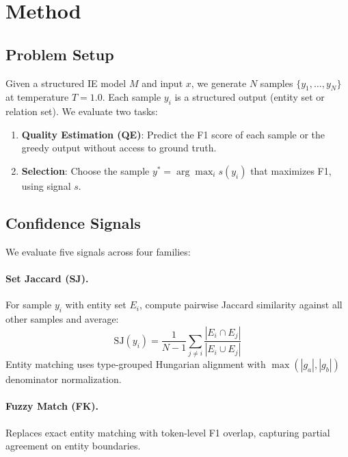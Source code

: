 \documentclass[11pt,a4paper]{article}
\begin{document}
\section{Method}

\subsection{Problem Setup}

Given a structured IE model $M$ and input $x$, we generate $N$ samples $\{y_1, \ldots, y_N\}$ at temperature $T{=}1.0$. Each sample $y_i$ is a structured output (entity set or relation set). We evaluate two tasks:
\begin{enumerate}
    \item \textbf{Quality Estimation (QE)}: Predict the F1 score of each sample or the greedy output without access to ground truth.
    \item \textbf{Selection}: Choose the sample $y^* = \arg\max_i s(y_i)$ that maximizes F1, using signal $s$.
\end{enumerate}

\subsection{Confidence Signals}

We evaluate five signals across four families:

\paragraph{Set Jaccard (SJ).} For sample $y_i$ with entity set $E_i$, compute pairwise Jaccard similarity against all other samples and average:
\begin{equation}
\text{SJ}(y_i) = \frac{1}{N{-}1} \sum_{j \neq i} \frac{|E_i \cap E_j|}{|E_i \cup E_j|}
\end{equation}
Entity matching uses type-grouped Hungarian alignment with $\max(|g_a|, |g_b|)$ denominator normalization.

\paragraph{Fuzzy Match (FK).} Replaces exact entity matching with token-level F1 overlap, capturing partial agreement on entity boundaries.
\end{document}
